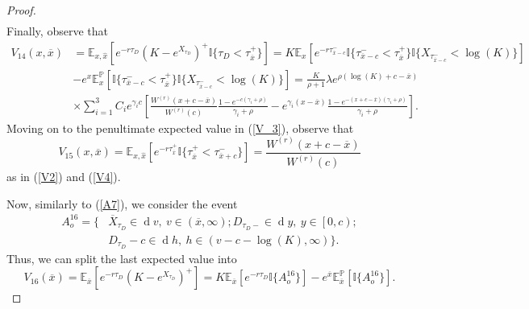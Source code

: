 \documentclass[10pt]{amsart}
\def\E{{\mathbb{E}}}
\def\Eq{{\mathbb{E}
		_{x,\hat{x}}}}
\def\P{{\mathbb{P}}}
\def \R{{{\rm I{\!}\rm R}}}
\def \I{{\mathbb{I}}}
\newcommand{\dx}{\operatorname{d}\!}
\def\P{{\mathbb P}} \def\le{\left} \def\ri{\right} \def\i{\infty}
\def\E{{\mathbb E}} \def\PP{\mc P} \def\Z{{\mathbb Z}} \def\R{{\mathbb R}}
\begin{document}
\begin{proof}
\begin{align*}
			\end{align*}
			Finally, observe that
			\begin{align}
				\nonumber V_{14}(x,\overline{x}) &= \Eq\left[ e^{-r\tau_D} \left( K - e^{X_{\tau_D}} \right)^+ \I
				\{ \tau_D < \tau_{\overline{x}}^+ \} \right]  =  K \E_x \left[ e^{-r\tau_{\overline{x}-c}^- }
				\I \{ \tau_{\overline{x}-c}^- < \tau_{\overline{x}}^+ \}
				\I \{ X_{\tau_{\overline{x}-c}^- } < \log(K)\}
				\right] \\
				\nonumber & - e^x \E^\P_x \left[
				\I \{ \tau_{\overline{x}-c}^- < \tau_{\overline{x}}^+ \}
				\I \{ X_{\tau_{\overline{x}-c}^- } < \log(K)\}
				\right] = \frac{K}{\rho+1} \lambda e^{\rho (\log(K)+c - \overline{x})} \\
				&\times \sum_{i=1}^3 C_i e^{\gamma_i c} \left[ \frac{W^{(r)}(x+c-\overline{x})}{W^{(r)}(c)}\frac{1 - e^{-c(\gamma_i+\rho)}}{\gamma_i + \rho} - e^{\gamma_i(x - \overline{x})}\frac{1 - e^{-(x+c-\overline{x})(\gamma_i+\rho)}}{\gamma_i + \rho} \right].\label{V14}
			\end{align}
			Moving on to the penultimate expected value in (\ref{V_3}), observe that
			\begin{equation}
				V_{15}(x,\overline{x}) = 	\Eq\left[ e^{-r\tau_{\overline{x}}^+} \I
				\{\tau_{\overline{x}}^+ < \tau_{\overline{x}+c}^- \} \right] = \frac{W^{(r)}(x+c-\overline{x})}{W^{(r)}(c)}\label{V15}
			\end{equation}
			as in (\ref{V2}) and (\ref{V4}).
			
			Now, similarly to (\ref{A7}), we consider the event
			\begin{align*}
				A_o^{16} = \{& \overline{X}_{\tau_D} \in \dx v,\ v \in (\overline{x}, \infty); D_{\tau_D-} \in \dx y,\ y \in \left[ 0,c \right); \\ \nonumber & D_{\tau_D} - c \in \dx h,\ h \in (v-c-\log(K), \infty)
				\}.
			\end{align*}
			Thus, we can split the last expected value into
			\begin{equation*}
				V_{16}(\overline{x}) =	\E_{\overline{x}}\left[ e^{-r\tau_D} \left( K - e^{X_{\tau_D}} \right)^+ \right] = K\E_{\overline{x}}\left[ e^{-r\tau_D} \I \{ A_o^{16} \} \right] - e^{\overline{x}} \E^\P_{\overline{x}}\left[ \I \{ A_o^{16} \} \right].
			\end{equation*}
			

\end{proof}
\end{document}
